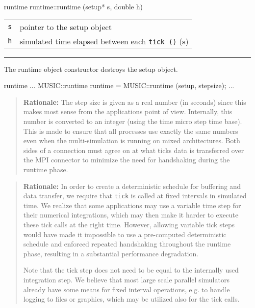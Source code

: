 \documentclass[a4paper]{report}
\makeatletter
\newenvironment{rationale}%
{\par\begin{quote}\textbf{Rationale:}}%
{\par\end{quote}}
\newenvironment{parameters}%
{\begin{tabular}{@{\hspace{2em}}lp{0.6\textwidth}}}%
{\end{tabular}\par\vspace{1mm}\par\hrule\par\vspace{5mm}}
\makeatother
\begin{document}
\begin{head}{runtime}
  runtime::runtime (setup* s, double h)
\end{head}
\begin{parameters}
  \lstinline|s| & pointer to the setup object \\
  \lstinline|h| & simulated time elapsed between each \lstinline|tick ()| (s) \\
\end{parameters}

The runtime object constructor destroys the setup object.

\begin{code}{runtime}
  ...
  MUSIC::runtime runtime = MUSIC::runtime (setup, stepsize);
  ...
\end{code}

\begin{rationale}
  The step size is given as a real number (in seconds) since this
  makes most sense from the applications point of view.  Internally,
  this number is converted to an integer (using the time micro step
  time base).  This is made to ensure that all processes use exactly
  the same numbers even when the multi-simulation is running on mixed
  architectures.  Both sides of a connection must agree on at what
  ticks data is transferred over the MPI connector to minimize the
  need for handshaking during the runtime phase.
\end{rationale}

\begin{rationale}
  In order to create a deterministic schedule for buffering and data
  transfer, we require that \lstinline|tick| is called at fixed
  intervals in simulated time.  We realize that some applications may
  use a variable time step for their
  numerical integrations, which may then make it harder to execute
  these tick calls at the right time.  However, allowing variable tick
  steps would have made it impossible to use a pre-computed
  deterministic schedule and enforced repeated handshaking throughout
  the runtime phase, resulting in a substantial performance
  degradation.

  Note that the tick step does not need to be equal to the internally
  used integration step.  We believe that most
  large scale parallel simulators already have some means for fixed
  interval operations, e.g. to handle logging to files or graphics,
  which may be utilized also for the tick calls.
\end{rationale}
\end{document}
